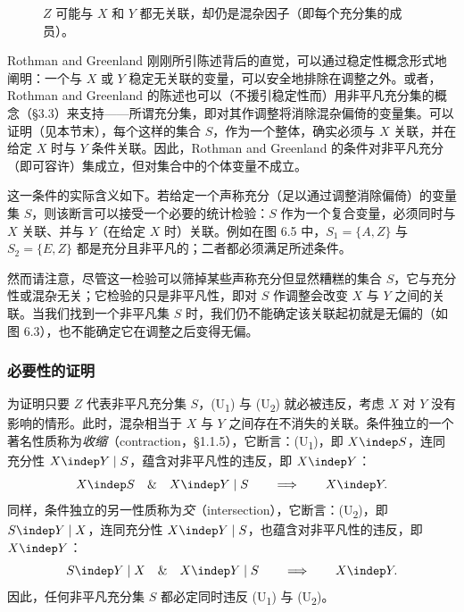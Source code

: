 \begin{figure}[htbp]
\centering
{}
\caption{$Z$ 可能与 $X$ 和 $Y$ 都无关联，却仍是混杂因子（即每个充分集的成员）。}
\label{fig:6.5}
\end{figure}

Rothman and Greenland 刚刚所引陈述背后的直觉，可以通过稳定性概念形式地阐明：一个与 $X$ 或 $Y$ 稳定无关联的变量，可以安全地排除在调整之外。或者，Rothman and Greenland 的陈述也可以（不援引稳定性而）用非平凡充分集的概念（\S 3.3）来支持——所谓充分集，即对其作调整将消除混杂偏倚的变量集。可以证明（见本节末），每个这样的集合 $S$，作为一个整体，确实必须与 $X$ 关联，并在给定 $X$ 时与 $Y$ 条件关联。因此，Rothman and Greenland 的条件对非平凡充分（即可容许）集成立，但对集合中的个体变量不成立。

这一条件的实际含义如下。若给定一个声称充分（足以通过调整消除偏倚）的变量集 $S$，则该断言可以接受一个必要的统计检验：$S$ 作为一个复合变量，必须同时与 $X$ 关联、并与 $Y$（在给定 $X$ 时）关联。例如在图 6.5 中，$S_1=\{A,Z\}$ 与 $S_2=\{E,Z\}$ 都是充分且非平凡的；二者都必须满足所述条件。

然而请注意，尽管这一检验可以筛掉某些声称充分但显然糟糕的集合 $S$，它与充分性或混杂无关；它检验的只是非平凡性，即对 $S$ 作调整会改变 $X$ 与 $Y$ 之间的关联。当我们找到一个非平凡集 $S$ 时，我们仍不能确定该关联起初就是无偏的（如图 6.3），也不能确定它在调整之后变得无偏。

\subsubsection*{必要性的证明}

为证明只要 $Z$ 代表非平凡充分集 $S$，(U\textsubscript{1}) 与 (U\textsubscript{2}) 就必被违反，考虑 $X$ 对 $Y$ 没有影响的情形。此时，混杂相当于 $X$ 与 $Y$ 之间存在不消失的关联。条件独立的一个著名性质称为\emph{收缩}（contraction，\S 1.1.5），它断言：(U\textsubscript{1})，即 $X\indep S$，连同充分性 $X\indep Y\mid S$，蕴含对非平凡性的违反，即 $X\indep Y$：
\[
X\indep S \quad\&\quad X\indep Y\mid S
\qquad\Longrightarrow\qquad X\indep Y.
\]
同样，条件独立的另一性质称为\emph{交}（intersection），它断言：(U\textsubscript{2})，即 $S\indep Y\mid X$，连同充分性 $X\indep Y\mid S$，也蕴含对非平凡性的违反，即 $X\indep Y$：
\[
S\indep Y\mid X \quad\&\quad X\indep Y\mid S
\qquad\Longrightarrow\qquad X\indep Y.
\]
因此，任何非平凡充分集 $S$ 都必定同时违反 (U\textsubscript{1}) 与 (U\textsubscript{2})。

